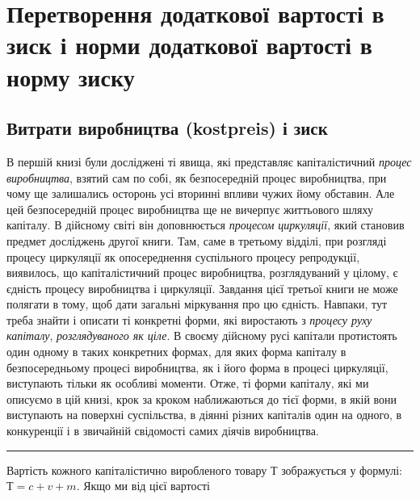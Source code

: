 
\chapter{Перетворення додаткової вартості в зиск і норми додаткової вартості в норму зиску}

\section{Витрати виробництва (kostpreis) і зиск}

В першій книзі були досліджені ті явища, які представляє капіталістичний
\emph{процес виробництва}, взятий сам по собі, як безпосередній
процес виробництва, при чому ще залишались осторонь
усі вторинні впливи чужих йому обставин. Але цей безпосередній
процес виробництва ще не вичерпує життьового шляху капіталу.
В дійсному світі він доповнюється \emph{процесом циркуляції},
який становив предмет досліджень другої книги. Там, саме в
третьому відділі, при розгляді процесу циркуляції як опосереднення
суспільного процесу репродукції, виявилось, що капіталістичний
процес виробництва, розглядуваний у цілому, є єдність
процесу виробництва і циркуляції. Завдання цієї третьої книги
не може полягати в тому, щоб дати загальні міркування про цю
єдність. Навпаки, тут треба знайти і описати ті конкретні форми,
які виростають з \emph{процесу руху капіталу}, \emph{розглядуваного як
ціле}. В своєму дійсному русі капітали протистоять один одному
в таких конкретних формах, для яких форма капіталу в безпосередньому
процесі виробництва, як і його форма в процесі циркуляції,
виступають тільки як особливі моменти. Отже, ті форми
капіталу, які ми описуємо в цій книзі, крок за кроком наближаються
до тієї форми, в якій вони виступають на поверхні
суспільства, в діянні різних капіталів один на одного, в конкуренції
і в звичайній свідомості самих діячів виробництва.

\pfbreak

Вартість кожного капіталістично виробленого товару $Т$ зображується
у формулі: $Т = c + v + m$. Якщо ми від цієї вартості
\parbreak{}  %
